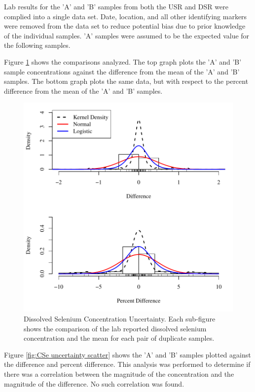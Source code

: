 \begin{linenumbers}
Lab results for the 'A' and 'B' samples from both the USR and DSR were complied into a single data set.  Date, location, and all other identifying markers were removed from the data set to reduce potential bias due to prior knowledge of the individual samples.  'A' samples were assumed to be the expected value for the following samples.  

Figure \ref{fig:CSe uncertainty} shows the comparisons analyzed.  The top graph plots the 'A' and 'B' sample concentrations against the difference from the mean of the 'A' and 'B' samples.  The bottom graph plots the same data, but with respect to the percent difference from the mean of the 'A' and 'B' samples.
\begin{figure}[htbp]
	\begin{center}
		\includegraphics[width=6in]{"Figures/Results_USR/Stochastic/CSe Error"}
		\caption[Dissolved Selenium Concentration Uncertainty.]{Dissolved Selenium Concentration Uncertainty.  Each sub-figure shows the comparison of the lab reported dissolved selenium concentration and the mean for each pair of duplicate samples.}
		\label{fig:CSe uncertainty}
	\end{center}
\end{figure}

Figure \ref{fig:CSe uncertainty scatter} shows the 'A' and 'B' samples plotted against the difference and percent difference.  This analysis was performed to determine if there was a correlation between the magnitude of the concentration and the magnitude of the difference.  No such correlation was found.


\end{linenumbers}

